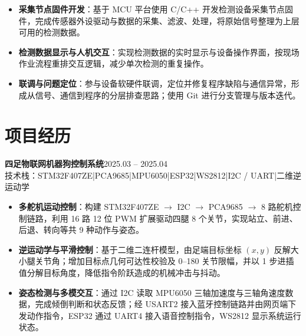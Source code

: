\documentclass[10pt,a4paper]{article}
\newcommand{\projectblock}[3]{%
    {\bfseries\color{darktext}#1}\hfill{\color{graytext}#2}\\%
    {\small\color{graytext}#3}%
    \vspace{0.15em}%
}
\begin{document}
\vspace{2pt}

\begin{itemize}[leftmargin=1.5em, itemsep=1pt, parsep=0pt, topsep=2pt]
    \item \textbf{采集节点固件开发}：基于 MCU 平台使用 C/C++ 开发检测设备采集节点固件，完成传感器外设驱动与数据的采集、滤波、处理，将原始信号整理为上层可用的检测数据。
    \item \textbf{检测数据显示与人机交互}：实现检测数据的实时显示与设备操作界面，按现场作业流程重排交互逻辑，减少单次检测的重复操作。
    \item \textbf{联调与问题定位}：参与设备软硬件联调，定位并修复程序缺陷与通信异常，形成从信号、通信到程序的分层排查思路；使用 Git 进行分支管理与版本迭代。
\end{itemize}

\vspace{0.2em}

\section{\faProjectDiagram\hspace{0.4em}项目经历}

\projectblock{四足物联网机器狗控制系统}{2025.03 -- 2025.04}{技术栈：STM32F407ZE\hspace{0.3em}|\hspace{0.3em}PCA9685\hspace{0.3em}|\hspace{0.3em}MPU6050\hspace{0.3em}|\hspace{0.3em}ESP32\hspace{0.3em}|\hspace{0.3em}WS2812\hspace{0.3em}|\hspace{0.3em}I2C / UART\hspace{0.3em}|\hspace{0.3em}二维逆运动学}

\begin{itemize}[leftmargin=1.5em, itemsep=1pt, parsep=0pt, topsep=2pt]
    \item \textbf{多舵机运动控制}：构建 STM32F407ZE $\rightarrow$ I2C $\rightarrow$ PCA9685 $\rightarrow$ 8 路舵机控制链路，利用 16 路 12 位 PWM 扩展驱动四腿 8 个关节，实现站立、前进、后退、转向等共 9 种动作与姿态。
    \item \textbf{逆运动学与平滑控制}：基于二维二连杆模型，由足端目标坐标 $(x, y)$ 反解大小腿关节角；增加目标点几何可达性校验及 0\textdegree--180\textdegree{} 关节限幅，并以 1\textdegree{} 步进插值分解目标角度，降低指令阶跃造成的机械冲击与抖动。
    \item \textbf{姿态检测与多模交互}：通过 I2C 读取 MPU6050 三轴加速度与三轴角速度数据，完成倾倒判断和状态反馈；经 USART2 接入蓝牙控制链路并由网页端下发动作指令，ESP32 通过 UART4 接入语音控制指令，WS2812 显示系统运行状态。
\end{itemize}
\end{document}
